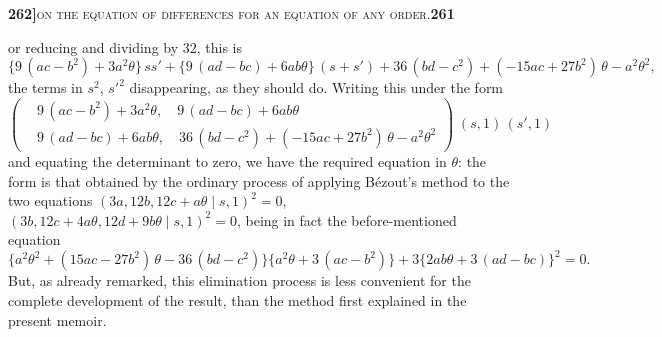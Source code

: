 \documentclass[11pt]{article}
\newcommand{\Cdel}{\mid}
\begin{document}
\newpage
\setcounter{page}{261}

\noindent\textbf{262]}\hfill\textsc{on the equation of differences for an equation of any order.}\hfill\textbf{261}

\medskip

\noindent or reducing and dividing by $32$, this is
\[
   \bigl\{9\,(ac - b^2) + 3 a^2\theta\bigr\}\,s s' + \bigl\{9\,(ad - bc) + 6 a b\theta\bigr\}\,(s + s') + 36\,(bd - c^2) + (-15 a c + 27 b^2)\,\theta - a^2\theta^2,
\]
the terms in $s^2$, $s'^2$ disappearing, as they should do. Writing this under the form
\[
   \left(
   \begin{aligned}
      & 9\,(ac - b^2) + 3 a^2\theta,\quad 9\,(ad - bc) + 6 a b\theta\\
      & 9\,(ad - bc) + 6 a b\theta,\quad 36\,(bd - c^2) + (-15 a c + 27 b^2)\,\theta - a^2\theta^2
   \end{aligned}
   \right)\;(s, 1)\,(s', 1)
\]
and equating the determinant to zero, we have the required equation in $\theta$: the form is that obtained by the ordinary process of applying B\'ezout's method to the two equations $(3a, 12b, 12c + a\theta \Cdel s, 1)^2 = 0$, $(3b, 12c + 4 a\theta, 12d + 9 b\theta \Cdel s, 1)^2 = 0$, being in fact the before-mentioned equation
\[
   \bigl\{a^2\theta^2 + (15 a c - 27 b^2)\,\theta - 36\,(bd - c^2)\bigr\}\bigl\{a^2\theta + 3\,(ac - b^2)\bigr\} + 3\bigl\{2 a b\theta + 3\,(ad - bc)\bigr\}^2 = 0.
\]
But, as already remarked, this elimination process is less convenient for the complete development of the result, than the method first explained in the present memoir.

\medskip
\end{document}
